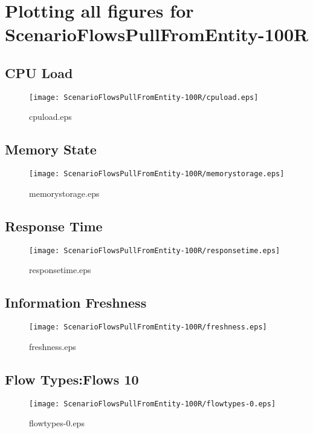 \documentclass{elsart}
\begin{document}
\section{Plotting all figures for ScenarioFlowsPullFromEntity-100R}
\subsection{CPU Load}

\begin{figure}[ht]
\centering
\texttt{[image: ScenarioFlowsPullFromEntity-100R/cpuload.eps]}
\caption{cpuload.eps}\label{fig:cpuload}
\end{figure}

\clearpage
\subsection{Memory State}

\begin{figure}[ht]
\centering
\texttt{[image: ScenarioFlowsPullFromEntity-100R/memorystorage.eps]}
\caption{memorystorage.eps}\label{fig:memorystorage}
\end{figure}

\clearpage
\subsection{Response Time}

\begin{figure}[ht]
\centering
\texttt{[image: ScenarioFlowsPullFromEntity-100R/responsetime.eps]}
\caption{responsetime.eps}\label{fig:responsetime}
\end{figure}

\clearpage
\subsection{Information Freshness}

\begin{figure}[ht]
\centering
\texttt{[image: ScenarioFlowsPullFromEntity-100R/freshness.eps]}
\caption{freshness.eps}\label{fig:freshness}
\end{figure}

\clearpage
\subsection{Flow Types:Flows 10}

\begin{figure}[ht]
\centering
\texttt{[image: ScenarioFlowsPullFromEntity-100R/flowtypes-0.eps]}
\caption{flowtypes-0.eps}\label{fig:flowtypes-0}
\end{figure}
\end{document}
